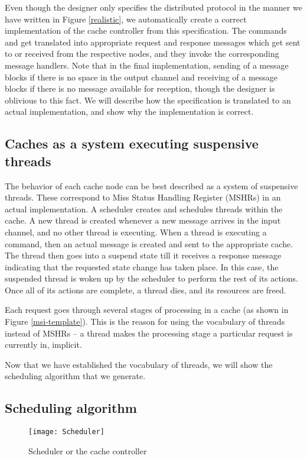 Even though the designer only specifies the distributed protocol in the manner we have
written in Figure \ref{realistic}, we automatically
create a correct implementation of the cache controller from this
specification.  The commands \send{} and \receive{} get translated into
appropriate request and response messages which get sent to or received from the respective
nodes, and they invoke the corresponding message handlers. Note that in the final
implementation, sending of a message blocks if there is no space in the output
channel and receiving of a message blocks if there is no message available for
reception, though the designer is oblivious to this fact. We will describe how
the specification is translated to an actual implementation, and show why the
implementation is correct.

\subsection{Caches as a system executing suspensive threads}
The behavior of each cache node can be best described as a system of suspensive
threads. These correspond to Miss Status Handling Register (MSHRs) in an actual
implementation. A scheduler creates and schedules threads within the cache.  A
new thread is created whenever a new message arrives in the input channel, and
no other thread is executing. When a thread is executing a \send{} command, then
an actual message is created and sent to the appropriate cache. The thread then
goes into a suspend state till it receives a response message indicating that
the requested state change has taken place. In this case, the suspended thread is
woken up by the scheduler to perform the rest of its actions. Once all of its
actions are complete, a thread dies, and its resources are freed.

Each request goes through several stages of processing in a cache (as shown in
Figure \ref{msi-template}). This is the reason for using the vocabulary of
threads instead of MSHRs -- a thread makes the processing stage a particular
request is currently in, implicit.

Now that we have established the vocabulary of threads, we will show the
scheduling algorithm that we generate.

\subsection{Scheduling algorithm}

\begin{figure}
\centering
\texttt{[image: Scheduler]}
\caption{Scheduler or the cache controller}
\label{Scheduler}
\end{figure}

